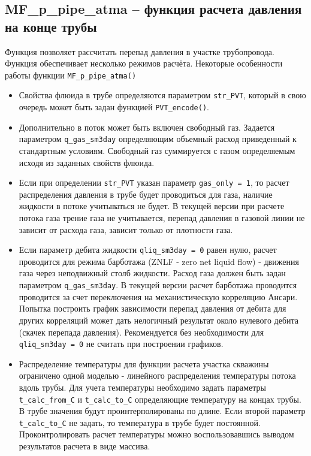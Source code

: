 \subsection{MF\_p\_pipe\_atma – функция расчета давления на конце трубы}  
Функция позволяет рассчитать перепад давления в участке трубопровода. Функция обеспечивает несколько режимов расчёта. Некоторые особенности работы функции \texttt{MF_p_pipe_atma()}
\begin{itemize}
	\item Свойства флюида в трубе определяются параметром \texttt{str_PVT}, который в свою очередь может быть задан функцией \texttt{PVT_encode()}.
	\item Дополнительно в поток может быть включен свободный газ. Задается параметром \texttt{q_gas_sm3day} определяющим объемный расход приведенный к стандартным условиям. Свободный газ суммируется с газом определяемым исходя из заданных свойств флюида. 
	\item Если при определении \texttt{str_PVT} указан параметр \texttt{gas_only = 1}, то расчет распределения давления в трубе будет проводиться для газа, наличие жидкости в потоке учитываться не будет. В текущей версии \unf{} при расчете потока газа трение газа не учитывается, перепад давления в газовой линии не зависит от расхода газа, зависит только от плотности газа.
	\item Если параметр дебита жидкости  \texttt{qliq_sm3day = 0}  равен нулю, расчет проводится для режима барботажа (ZNLF - zero net liquid flow) - движения газа через неподвижный столб жидкости. Расход газа должен быть задан параметром \texttt{q_gas_sm3day}. В текущей версии \unf{} расчет барботажа проводится проводится за счет переключения на механистическую корреляцию Ансари. Попытка построить график зависимости перепад давления от дебита для других корреляций может дать нелогичный результат около нулевого дебита (скачек перепада давления). Рекомендуется без необходимости для \texttt{qliq_sm3day = 0} не считать при построении графиков.
	\item Распределение температуры для функции расчета участка скважины ограничено одной моделью - линейного распределения температуры потока вдоль трубы. Для учета температуры необходимо задать параметры \texttt{t_calc_from_C} и \texttt{t_calc_to_C} определяющие температуру на концах трубы. В трубе значения будут проинтерполированы по длине. Если второй параметр \texttt{t_calc_to_C} не задать, то температура в трубе будет постоянной. Проконтролировать расчет температуры можно воспользовавшись выводом результатов расчета в виде массива.
\end{itemize}
 

